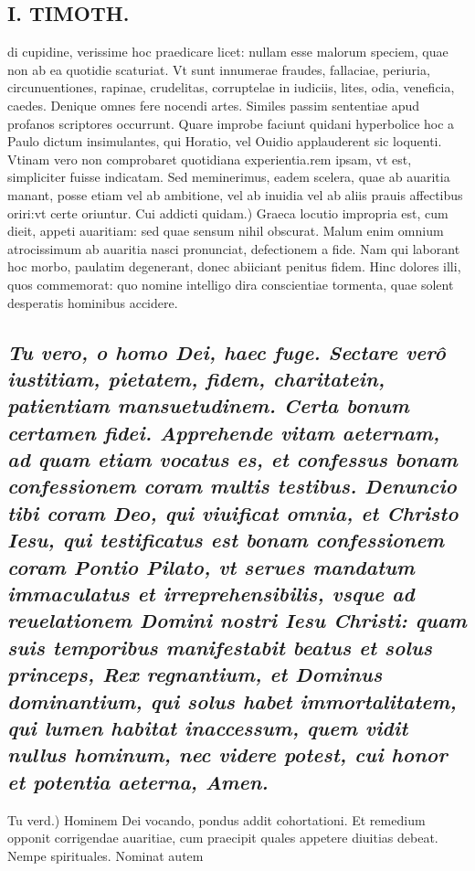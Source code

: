 \documentclass{article}
\begin{document}
\begin{pages}
\section*{I. TIMOTH. }
\marginpar{[ p.78 ]}\pstart di cupidine, verissime hoc praedicare licet: nullam esse malorum speciem, quae non ab ea quotidie scaturiat. Vt sunt innumerae fraudes, fallaciae, periuria, circunuentiones, rapinae, crudelitas, corruptelae in iudiciis, lites, odia, veneficia, caedes. Denique omnes fere nocendi artes. Similes passim sententiae apud profanos scriptores occurrunt. Quare improbe faciunt quidani hyperbolice hoc a Paulo dictum insimulantes, qui Horatio, vel Ouidio applauderent sic loquenti. Vtinam vero non comprobaret quotidiana experientia.rem ipsam, vt est, simpliciter fuisse indicatam. Sed meminerimus, eadem scelera, quae ab auaritia manant, posse etiam vel ab ambitione, vel ab inuidia vel ab aliis prauis affectibus oriri:vt certe oriuntur.  \pend\pstart Cui addicti quidam.) Graeca locutio impropria est, cum dieit, appeti auaritiam: sed quae sensum nihil obscurat. Malum enim omnium atrocissimum ab auaritia nasci pronunciat, defectionem a fide. Nam qui laborant hoc morbo, paulatim degenerant, donec abiiciant penitus fidem. Hinc dolores illi, quos commemorat: quo nomine intelligo dira conscientiae tormenta, quae solent desperatis hominibus accidere.  \pend
{}
{}
\subsection*{\textit{Tu vero, o homo Dei, haec fuge. Sectare verô iustitiam, pietatem, fidem, charitatein, patientiam mansuetudinem. Certa bonum certamen fidei. Apprehende vitam aeternam, ad quam etiam vocatus es, et confessus bonam confessionem coram multis testibus. Denuncio tibi coram Deo, qui viuificat omnia, et Christo Iesu, qui testificatus est bonam confessionem coram Pontio Pilato, vt serues mandatum immaculatus et irreprehensibilis, vsque ad reuelationem Domini nostri Iesu Christi: quam suis temporibus manifestabit beatus et solus princeps, Rex regnantium, et Dominus dominantium, qui solus habet immortalitatem, qui lumen habitat inaccessum, quem vidit nullus hominum, nec videre potest, cui honor et potentia aeterna, Amen. }}\pstart Tu verd.) Hominem Dei vocando, pondus addit cohortationi. Et remedium opponit corrigendae auaritiae, cum praecipit quales appetere diuitias debeat. Nempe spirituales. Nominat autem  \pend

\end{pages}
\end{document}
